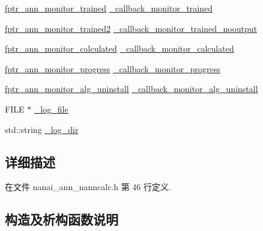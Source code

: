 \begin{DoxyCompactItemize}
\item 
\hyperlink{namespacenanai_adb209ab120b98e800db2b0c8621cd488}{fptr\+\_\+ann\+\_\+monitor\+\_\+trained} \hyperlink{classnanai_1_1nanai__ann__nanncalc_abe6bd5a48bafb89a185a8e359ffdcff3}{\+\_\+callback\+\_\+monitor\+\_\+trained}
\item 
\hyperlink{namespacenanai_a598e872bf861dac8080e98d6d155b3b5}{fptr\+\_\+ann\+\_\+monitor\+\_\+trained2} \hyperlink{classnanai_1_1nanai__ann__nanncalc_a0395dff2948785f646f22be1df04bad1}{\+\_\+callback\+\_\+monitor\+\_\+trained\+\_\+nooutput}
\item 
\hyperlink{namespacenanai_afc00080af95a1dc2349880f03d7d6a88}{fptr\+\_\+ann\+\_\+monitor\+\_\+calculated} \hyperlink{classnanai_1_1nanai__ann__nanncalc_af9ee346f2307a03b8570ec21839a3e88}{\+\_\+callback\+\_\+monitor\+\_\+calculated}
\item 
\hyperlink{namespacenanai_a5c9964edbd4db8ae35df7cd024020e87}{fptr\+\_\+ann\+\_\+monitor\+\_\+progress} \hyperlink{classnanai_1_1nanai__ann__nanncalc_af937dc713e3780b86b5ebf2311360dd7}{\+\_\+callback\+\_\+monitor\+\_\+progress}
\item 
\hyperlink{namespacenanai_a04b231ce428a771ab1a9aace53be65c6}{fptr\+\_\+ann\+\_\+monitor\+\_\+alg\+\_\+uninstall} \hyperlink{classnanai_1_1nanai__ann__nanncalc_a524fbed26f582cdf403407173da1634b}{\+\_\+callback\+\_\+monitor\+\_\+alg\+\_\+uninstall}
\item 
F\+I\+L\+E $\ast$ \hyperlink{classnanai_1_1nanai__ann__nanncalc_ad7f1e9a64ffdf10347e0f7175a73103c}{\+\_\+log\+\_\+file}
\item 
std\+::string \hyperlink{classnanai_1_1nanai__ann__nanncalc_ad02491864e160b837d6b84f635f5947a}{\+\_\+log\+\_\+dir}
\end{DoxyCompactItemize}


\subsection{详细描述}


在文件 nanai\+\_\+ann\+\_\+nanncalc.\+h 第 46 行定义.



\subsection{构造及析构函数说明}
\hypertarget{classnanai_1_1nanai__ann__nanncalc_a0d26e7efdef5368c0212b3dd02f63767}{}
